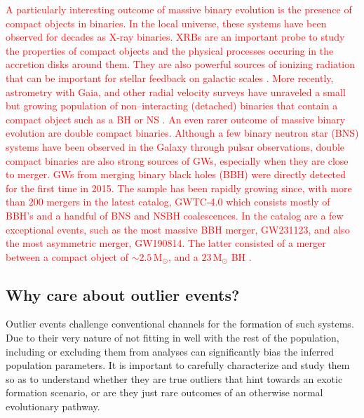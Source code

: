\documentclass[linenumbers,trackchanges,twocolumn]{aastex701}
\newcommand{\Mdot}{\mathrm{M}_{\odot}}
\newcommand{\red}{\textcolor{red}}
\begin{document}
\red{A particularly interesting outcome of massive binary evolution is the presence of compact objects in binaries. In the local universe, these systems have been observed for decades as X-ray binaries. XRBs are an important probe to study the properties of compact objects and the physical processes occuring in the accretion disks around them. They are also powerful sources of ionizing radiation that can be important for stellar feedback on galactic scales \citep{2012MNRAS.423.1641J}. More recently, astrometry with Gaia, and other radial velocity surveys have unraveled a small but growing population of non--interacting (detached) binaries that contain a compact object such as a BH \citep{2023MNRAS.518.1057E,2023MNRAS.521.4323E,2024A&A...686L...2G} or NS \citep{2024OJAp....7E..58E}. An even rarer outcome of massive binary evolution are double compact binaries. Although a few binary neutron star (BNS) systems have been observed in the Galaxy through pulsar observations, double compact binaries are also strong sources of GWs, especially when they are close to merger. GWs from merging binary black holes (BBH) were directly detected for the first time in 2015. The sample has been rapidly growing since, with more than $200$ mergers in the latest catalog, GWTC-4.0 \citep{2025arXiv250818082T,2025arXiv250818083T} which consists mostly of BBH's and a handful of BNS and NSBH coalescences. In the catalog are a few exceptional events, such as the most massive BBH merger, GW231123, and also the most asymmetric merger, GW190814. The latter consisted of a merger between a compact object of $\sim 2.5\,\Mdot$, and a $23\,\Mdot$ BH \citep{2020ApJ...896L..44A}.}

\subsection{Why care about outlier events?}

Outlier events challenge conventional channels for the formation of such systems. Due to their very nature of not fitting in well with the rest of the population, including or excluding them from analyses can significantly bias the inferred population parameters. It is important to carefully characterize and study them so as to understand whether they are true outliers that hint towards an exotic formation scenario, or are they just rare outcomes of an otherwise normal evolutionary pathway. 
\end{document}
